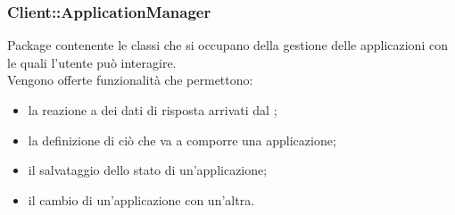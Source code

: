 \subsubsection{Client::ApplicationManager}
Package contenente le classi che si occupano della gestione delle applicazioni con le quali l'utente può interagire.\\
Vengono offerte funzionalità che permettono:
\begin{itemize}
	\item la reazione a dei dati di risposta arrivati dal ;
	\item la definizione di ciò che va a comporre una applicazione;
	\item il salvataggio dello stato di un'applicazione;
	\item il cambio di un'applicazione con un'altra.
\end{itemize}

